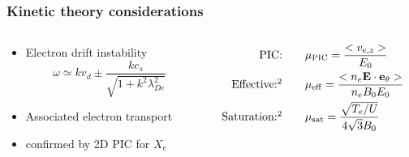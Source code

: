 \documentclass[sans, aspectratio=169]{beamer}
\begin{document}
\begin{frame} 
	\frametitle{Kinetic theory considerations} 

	\begin{columns}
		\begin{column}{0.45\linewidth}
		\begin{itemize}
		\item Electron drift instability
		\begin{equation}
		\omega \simeq k v_d \pm \frac{ k c_s}{\sqrt{1 + k^2\lambda_{De}^2}}
		\end{equation}
		\item Associated electron transport
		\item confirmed by 2D PIC for $X_e$ \footnotemark[1]
		\end{itemize}
		
		\end{column}
		
		\begin{column}{0.45\linewidth}
		
		\begin{align*}
			\text{PIC:} \qquad& 
			\mu_{\rm PIC} = \frac{<v_{e,z}>}{E_0} \\
			\text{Effective:} \footnotemark[2] \qquad&
			\mu_{\rm eff} = \frac{<n_{e} {\bf E \cdot e_{\theta}}>}{n_e B_0 E_0} \\
			\text{Saturation:} \footnotemark[2] \qquad&
			\mu_{\rm sat} = \frac{ \sqrt{T_e / U}}{4 \sqrt{3} B_0 } 
		\end{align*}
		
		\end{column}
		
	\end{columns}
\end{frame}
\end{document}
